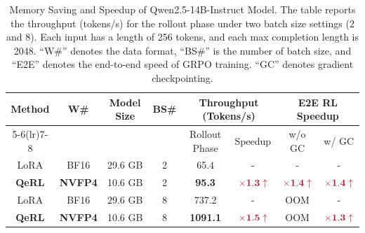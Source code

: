 \begin{table}[!t]
\centering
\begin{tabular}{cccccccc}
\toprule
\multirow{2}{*}{\textbf{Method}} & \multirow{2}{*}{\textbf{W\#}} & \multirow{2}{*}{\textbf{Model Size}} & \multirow{2}{*}{\textbf{BS\#}} & \multicolumn{2}{c}{\textbf{Throughput (Tokens/s)}}&\multicolumn{2}{c}{\textbf{E2E RL Speedup}} \\ 
\cmidrule(lr){5-6}\cmidrule(lr){7-8}
&&&& Rollout Phase & Speedup & w/o GC & w/ GC \\
\midrule
LoRA&BF16  & 29.6 GB& 2 & 65.4 & - & - & - \\  

\textbf{QeRL}&\textbf{NVFP4}  & 10.6 GB& 2  & \textbf{95.3}&$\textcolor{hanred}{\times\mathbf{1.3}\uparrow}$&$\textcolor{hanred}{\times\mathbf{1.4}\uparrow}$ &$\textcolor{hanred}{\times\mathbf{1.4}\uparrow}$ \\ 
\midrule \midrule
LoRA&BF16  &29.6 GB& 8 &737.2& - & OOM & - \\ 

\textbf{QeRL}&\textbf{NVFP4}  &10.6 GB& 8 &\textbf{1091.1}&$\textcolor{hanred}{\times\mathbf{1.5}\uparrow}$& OOM &$\textcolor{hanred}{\times\mathbf{1.3}\uparrow}$ \\ 
\bottomrule
\end{tabular}
\caption{Memory Saving and Speedup of Qwen2.5-14B-Instruct Model. The table reports the throughput (tokens/s) for the rollout phase under two batch size settings (2 and 8). Each input has a length of 256 tokens, and each max completion length is 2048. ``W\#'' denotes the data format, ``BS\#'' is the number of batch size, and ``E2E'' denotes the end-to-end speed of GRPO training. ``GC'' denotes gradient checkpointing.} \label{tab:efficiency_14b}
\end{table}

